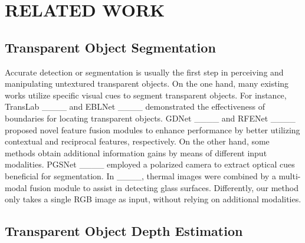 \section{RELATED WORK}
\subsection{Transparent Object Segmentation}

Accurate detection or segmentation is usually the first step in perceiving and manipulating untextured transparent objects. On the one hand, many existing works utilize specific visual cues to segment transparent objects. For instance, TransLab ____ and EBLNet ____ demonstrated the effectiveness of boundaries for locating transparent objects. GDNet ____ and RFENet ____ proposed novel feature fusion modules to enhance performance by better utilizing contextual and reciprocal features, respectively. On the other hand, some methods obtain additional information gains by means of different input modalities. PGSNet ____ employed a polarized camera to extract optical cues beneficial for segmentation. In ____, thermal images were combined by a multi-modal fusion module to assist in detecting glass surfaces. Differently, our method only takes a single RGB image as input, without relying on additional modalities.

\subsection{Transparent Object Depth Estimation}

